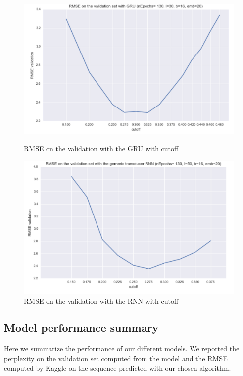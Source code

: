 \documentclass[11pt]{article}
\begin{document}
\begin{figure}[H]
\centering
\begin{minipage}{.5\textwidth}
  \centering
  \includegraphics[width=1\linewidth]{gru_cutoff}
  \caption{RMSE on the validation with the GRU with cutoff}
\end{minipage}%
\begin{minipage}{.5\textwidth}
  \centering
  \includegraphics[width=1\linewidth]{rnn_cutoff}
  \caption{RMSE on the validation with the RNN with cutoff}
\end{minipage}
\end{figure}



\subsection{Model performance summary}

Here we summarize the performance of our different models. We reported the perplexity on the validation set computed from the model and the RMSE computed by Kaggle on the sequence predicted with our chosen algorithm.
\end{document}
